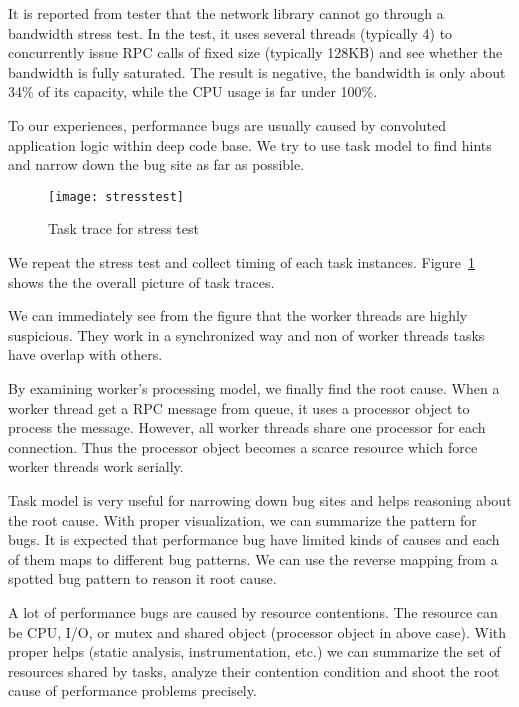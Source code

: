 It is reported from tester that the \cosmos network library
cannot go through a bandwidth stress test. In the test, it
uses several threads (typically 4) to concurrently issue RPC
calls of fixed size (typically 128KB) and see whether the
bandwidth is fully saturated. The result is negative, the
bandwidth is only about 34\% of its capacity, while the
CPU usage is far under 100\%.

To our experiences, performance bugs are usually caused by
convoluted application logic within deep code base. We try
to use task model to find hints and narrow down the bug site
as far as possible.

\begin{figure}
\centering
\texttt{[image: stresstest]}
\caption{Task trace for stress test}
\label{fig:stresstest}
\end{figure}

We repeat the stress test and collect timing of each task
instances. Figure~\ref{fig:stresstest} shows the the overall
picture of task traces.

We can immediately see from the figure that the worker
threads are highly suspicious. They work in a synchronized
way and non of worker threads tasks have overlap with
others.

By examining \cosmos worker's processing model, we finally
find the root cause. When a worker thread get a RPC message
from queue, it uses a processor object to process the
message. However, all worker threads share one processor for
each connection. Thus the processor object becomes a scarce
resource which force worker threads work serially.

\lesson Task model is very useful for narrowing down bug
sites and helps reasoning about the root cause. With proper
visualization, we can summarize the pattern for bugs. It is
expected that performance bug have limited kinds of causes
and each of them maps to different bug patterns. We can use
the reverse mapping from a spotted bug pattern to reason it
root cause.

A lot of performance bugs are caused by resource
contentions. The resource can be CPU, I/O, or mutex and
shared object (processor object in above case). With proper
helps (static analysis, instrumentation, etc.) we can
summarize the set of resources shared by tasks, analyze
their contention condition and shoot the root cause of
performance problems precisely.

